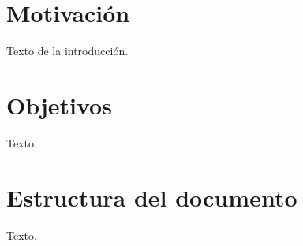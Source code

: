 \section{Motivación}

Texto de la introducción.

\section{Objetivos}

Texto.

\section{Estructura del documento}

Texto.
